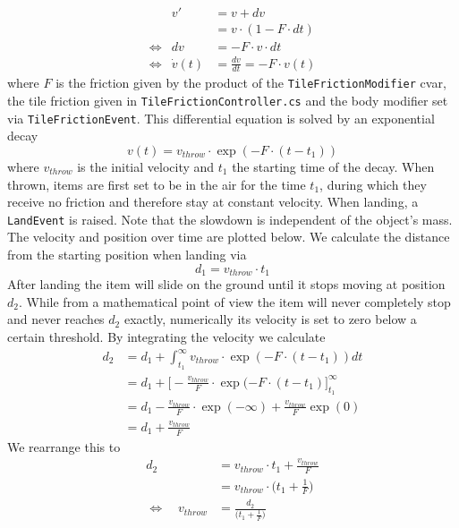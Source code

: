 \documentclass[12pt,a4paper]{article}
\begin{document}
\begin{align}
 &                 & v'         &= v + dv& \\
 &                 &            &= v \cdot (1 - F \cdot dt)& \\
 &\Leftrightarrow  & dv         &= -F \cdot v \cdot dt& \\
 &\Leftrightarrow  & \dot{v}(t) &= \frac{dv}{dt} = -F \cdot v(t)& 
\end{align}
where $F$ is the friction given by the product of the \texttt{TileFrictionModifier} cvar, the tile friction given in \texttt{TileFrictionController.cs} and the body modifier set via \texttt{TileFrictionEvent}.
\vskip 0.5cm
This differential equation is solved by an exponential decay
\begin{equation}
v(t)=v_{throw}\cdot \exp(-F \cdot(t-t_1))
\end{equation}
where $v_{throw}$ is the initial velocity and $t_1$ the starting time of the decay. When thrown, items are first set to be in the air for the time $t_1$, during which they receive no friction and therefore stay at constant velocity. When landing, a \texttt{LandEvent} is raised. Note that the slowdown is independent of the object's mass.
\vskip 0.5cm
The velocity and position over time are plotted below. We calculate the distance from the starting position when landing via
\begin{equation}
d_1=v_{throw} \cdot t_1
\end{equation}
After landing the item will slide on the ground until it stops moving at position $d_2$. While from a mathematical point of view the item will never completely stop and never reaches $d_2$ exactly, numerically its velocity is set to zero below a certain threshold. By integrating the velocity we calculate
\begin{align}
d_2 &= d_1 + \int_{t_1}^{\infty} v_{throw} \cdot \exp(-F \cdot(t-t_1))dt\\
&= d_1 + \Big[-\frac{v_{throw}}{F} \cdot \exp(-F \cdot(t-t_1)\Big]_{t_1}^{\infty}\\
&= d_1 - \frac{v_{throw}}{F}\cdot \exp(-\infty) + \frac{v_{throw}}{F} \exp(0)\\
&= d_1 + \frac{v_{throw}}{F}
\end{align}
We rearrange this to
\begin{align}
d_2 &= v_{throw} \cdot t_1 + \frac{v_{throw}}{F}\\
&= v_{throw}\cdot\Big(t_1+\frac{1}{F}\Big)\\
\Leftrightarrow \quad v_{throw} &= \frac{d_2}{\big(t_1+\frac{1}{F}\big)}
\end{align}
\end{document}
